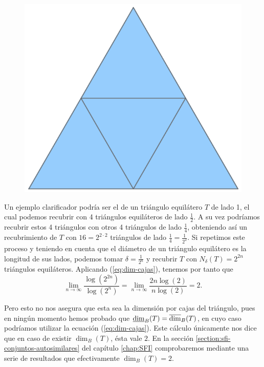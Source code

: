 \begin{figure}
\includegraphics[scale=0.14, trim={0cm 0.35cm 0cm 0.5cm}, clip]{./img/triangulo-dividido.png}
\end{figure}
Un ejemplo clarificador podría ser el de un triángulo equilátero $T$ de lado 1, el cual podemos recubrir con 4 triángulos equiláteros de lado $\frac 1 2$. A su vez podríamos recubrir estos 4 triángulos con otros 4 triángulos de lado $\frac{1}{4}$, obteniendo así un recubrimiento de $T$ con $16=2^{2\cdot 2}$ triángulos de lado $\frac{1}{4}=\frac{1}{2^2}$. Si repetimos este proceso y teniendo en cuenta que el diámetro de un triángulo equilátero es la longitud de sus lados, podemos tomar $\delta=\frac{1}{2^n}$ y recubrir $T$ con $N_\delta(T)=2^{2n}$ triángulos equiláteros. Aplicando (\ref{eq:dim-cajas}), tenemos por tanto que
$$
\lim_{n\rightarrow\infty}\dfrac{\log(2^{2n})}{\log(2^n)} = \lim_{n\rightarrow\infty}\dfrac{2n\log(2)}{n\log(2)}=2.
$$

Pero esto no nos asegura que esta sea la dimensión por cajas del triángulo, pues en ningún momento hemos probado que $\underline{\dim}_B(T)=\overline{\dim}_B(T)$, en cuyo caso podríamos utilizar la ecuación (\ref{eq:dim-cajas}). Este cálculo únicamente nos dice que en caso de existir $\dim_B(T)$, ésta vale $2$. En la sección \ref{section:sfi-conjuntos-autosimilares} del capítulo \ref{chap:SFI} comprobaremos mediante una serie de resultados que efectivamente $\dim_B(T)=2$.

